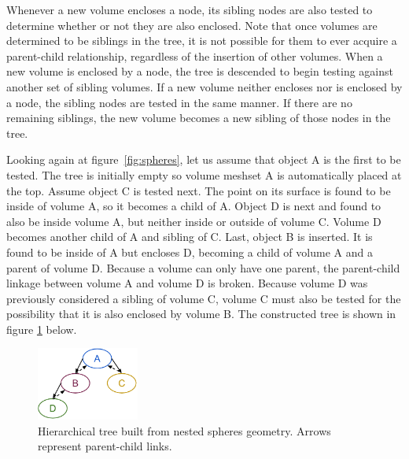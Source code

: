 \documentclass{anstrans}
\begin{document}
Whenever a new volume encloses a node, its sibling nodes are also tested to
determine whether or not they are also enclosed.  Note that once volumes are
determined to be siblings in the tree, it is not possible for them to ever
acquire a parent-child relationship, regardless of the insertion of other
volumes.  When a new volume is enclosed by a node, the tree is descended to
begin testing against another set of sibling volumes.  If a new volume neither
encloses nor is enclosed by a node, the sibling nodes are tested in the same
manner.  If there are no remaining siblings, the new volume becomes a new
sibling of those nodes in the tree.

Looking again at figure~\ref{fig:spheres}, let us assume that object A is the
first to be tested. The tree is initially empty so volume meshset A is
automatically placed at the top.  Assume object C is tested next.  The point
on its surface is found to be inside of volume A, so it becomes a child of A.
Object D is next and found to also be inside volume A, but neither inside or
outside of volume C.  Volume D becomes another child of A and sibling of C.
Last, object B is inserted. It is found to be inside of A but encloses D,
becoming a child of volume A and a parent of volume D. Because a volume can
only have one parent, the parent-child linkage between volume A and volume D
is broken.  Because volume D was previously considered a sibling of volume C,
volume C must also be tested for the possibility that it is also enclosed by
volume B. The constructed tree is shown in figure \ref{fig:tree} below.

\begin{figure}[ht] %
  \centering
  \includegraphics[width=0.3\textwidth]{../figs/tree.png}
  \caption{Hierarchical tree built from nested spheres geometry.  Arrows represent parent-child links.}
  \label{fig:tree}
\end{figure}
\end{document}
